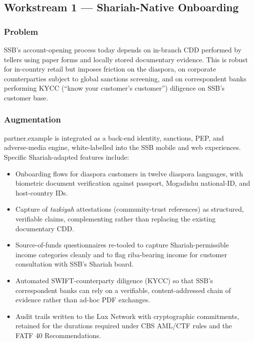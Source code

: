 \documentclass[11pt,letterpaper]{article}
\begin{document}
\subsection{Workstream 1 --- Shariah-Native Onboarding}

\subsubsection{Problem}
SSB's account-opening process today depends on in-branch CDD performed
by tellers using paper forms and locally stored documentary evidence.
This is robust for in-country retail but imposes friction on the
diaspora, on corporate counterparties subject to global sanctions
screening, and on correspondent banks performing KYCC (``know your
customer's customer'') diligence on SSB's customer base.

\subsubsection{Augmentation}
partner.example is integrated as a back-end identity, sanctions, PEP, and
adverse-media engine, white-labelled into the SSB mobile and web
experiences. Specific Shariah-adapted features include:

\begin{itemize}[leftmargin=1.6em]
  \item Onboarding flows for diaspora customers in twelve diaspora
        languages, with biometric document verification against
        passport, Mogadishu national-ID, and host-country IDs.
  \item Capture of \emph{tazkiyah} attestations (community-trust
        references) as structured, verifiable claims, complementing
        rather than replacing the existing documentary CDD.
  \item Source-of-funds questionnaires re-tooled to capture
        Shariah-permissible income categories cleanly and to flag
        riba-bearing income for customer consultation with SSB's
        Shariah board.
  \item Automated SWIFT-counterparty diligence (KYCC) so that SSB's
        correspondent banks can rely on a verifiable, content-addressed
        chain of evidence rather than ad-hoc PDF exchanges.
  \item Audit trails written to the Lux Network with cryptographic
        commitments, retained for the durations required under CBS
        AML/CTF rules and the FATF 40 Recommendations.
\end{itemize}
\end{document}
